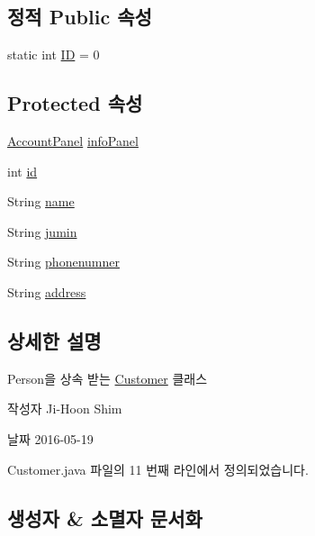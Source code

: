 \subsection*{정적 Public 속성}
\begin{DoxyCompactItemize}
\item 
static int \hyperlink{classpkg_1_1_person_af93c4dddd917c1fd77adc3eb68af3e54}{ID} = 0
\end{DoxyCompactItemize}
\subsection*{Protected 속성}
\begin{DoxyCompactItemize}
\item 
\hyperlink{classpkg_1_1_account_panel}{Account\+Panel} \hyperlink{classpkg_1_1_person_a4a1890f00be07d1bc4e3e9df16425210}{info\+Panel}
\item 
int \hyperlink{classpkg_1_1_person_acd3bca96258af32adc1eca89b74222a6}{id}
\item 
String \hyperlink{classpkg_1_1_person_a37fd1fe3cf039df98ffca54df6002bb6}{name}
\item 
String \hyperlink{classpkg_1_1_person_aef72766ac67a0af8074b513d00c523f8}{jumin}
\item 
String \hyperlink{classpkg_1_1_person_aa7a67349f91a08a8cc45067354653c1d}{phonenumner}
\item 
String \hyperlink{classpkg_1_1_person_a692aadebf7edf808fbcbacbcaed07ef3}{address}
\end{DoxyCompactItemize}


\subsection{상세한 설명}
Person을 상속 받는 \hyperlink{classpkg_1_1_customer}{Customer} 클래스 

\begin{DoxyAuthor}{작성자}
Ji-\/\+Hoon Shim 
\end{DoxyAuthor}
\begin{DoxyDate}{날짜}
2016-\/05-\/19 
\end{DoxyDate}


Customer.\+java 파일의 11 번째 라인에서 정의되었습니다.



\subsection{생성자 \& 소멸자 문서화}
